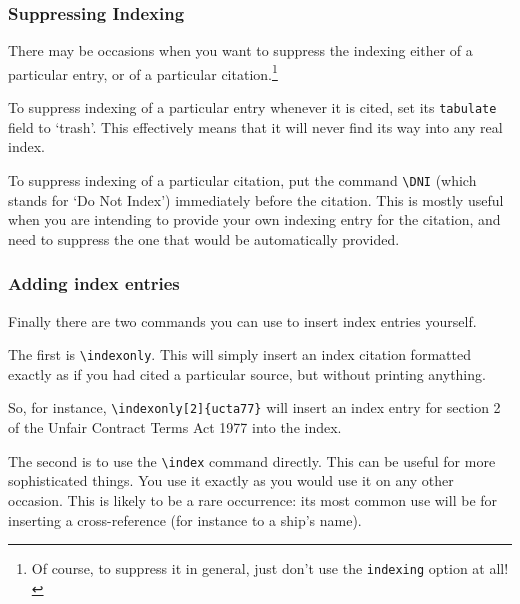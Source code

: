 \documentclass[a4paper,
               11pt,
	       DIV=1,			   
	       footinclude=false]
	      {scrartcl}
\begin{document}
\subsubsection{Suppressing Indexing}

There may be occasions when you want to suppress the indexing either
of a particular entry, or of a particular citation.\footnote{Of course, to suppress it in general, just don't use the \texttt{indexing} option at all!}

To suppress indexing of a particular entry whenever it is cited, set
its \texttt{tabulate} field to `trash'. This effectively means that it
will never find its way into any real index.

To suppress indexing of a particular citation, put the command
\verb|\DNI| (which stands for `Do Not Index') immediately before the
citation. This is mostly useful when you are intending to provide
your own indexing entry for the citation, and need to suppress the one
that would be automatically provided.

\subsubsection{Adding index entries\label{trickyindexing}}

Finally there are two commands you can use to insert index entries yourself.

The first is \verb|\indexonly|. This will simply insert an index
citation formatted exactly as if you had cited a particular source,
but without printing anything.

So, for instance, \verb|\indexonly[2]{ucta77}| will insert an index
entry for section 2 of the Unfair Contract Terms Act 1977 into the
index.

The second is to use the \verb|\index| command directly. This can be
useful for more sophisticated things. You use it exactly as you would
use it on any other occasion. This is likely to be a rare occurrence:
its most common use will be for inserting a cross-reference (for
instance to a ship's name).
\end{document}
